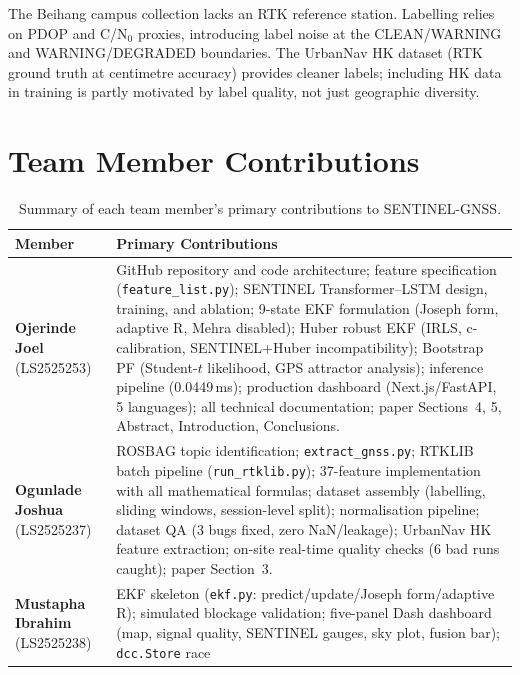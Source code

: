 \documentclass[12pt,a4paper]{article}
\newcommand{\code}[1]{\texttt{#1}}
\begin{document}
The Beihang campus collection lacks an RTK reference station.
Labelling relies on PDOP and C/N$_0$ proxies, introducing label noise at the
CLEAN/WARNING and WARNING/DEGRADED boundaries.
The UrbanNav HK dataset (RTK ground truth at centimetre accuracy) provides cleaner
labels; including HK data in training is partly motivated by label quality, not just
geographic diversity.

\section{Team Member Contributions}
\label{sec:team}

\begin{table}[H]
	\centering
	\caption{Summary of each team member's primary contributions to SENTINEL-GNSS.}
	\begin{tabularx}{\textwidth}{>{\raggedright\arraybackslash}p{3cm}X}
		\textbf{Member} & \textbf{Primary Contributions} \\
		\midrule
    \textbf{Ojerinde Joel} (LS2525253) &
      GitHub repository and code architecture; feature specification
      (\code{feature\_list.py}); SENTINEL Transformer--LSTM design, training,
      and ablation; 9-state EKF formulation (Joseph form, adaptive R, Mehra
      disabled); Huber robust EKF (IRLS, c-calibration, SENTINEL+Huber
      incompatibility); Bootstrap PF (Student-$t$ likelihood, GPS attractor
      analysis); inference pipeline (0.0449\,ms); production dashboard
      (Next.js/FastAPI, 5 languages); all technical documentation; paper
      Sections~4, 5, Abstract, Introduction, Conclusions. \\
    \midrule
    \textbf{Ogunlade Joshua} (LS2525237) &
      ROSBAG topic identification; \code{extract\_gnss.py}; RTKLIB batch
      pipeline (\code{run\_rtklib.py}); 37-feature implementation with all
      mathematical formulas; dataset assembly (labelling, sliding windows,
      session-level split); normalisation pipeline; dataset QA (3 bugs fixed,
      zero NaN/leakage); UrbanNav HK feature extraction; on-site real-time
      quality checks (6 bad runs caught); paper Section~3. \\
    \midrule
    \textbf{Mustapha Ibrahim} (LS2525238) &
      EKF skeleton (\code{ekf.py}: predict/update/Joseph form/adaptive R);
      simulated blockage validation; five-panel Dash dashboard (map, signal
      quality, SENTINEL gauges, sky plot, fusion bar); \code{dcc.Store} race

\end{tabularx}
\end{table}
\end{document}
